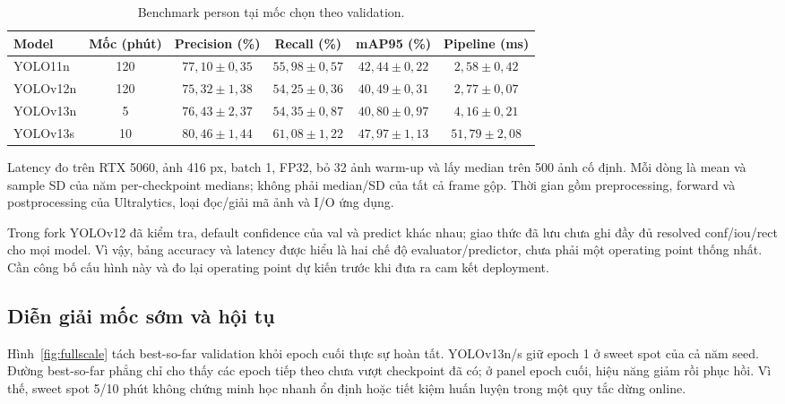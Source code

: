 \documentclass[a4paper,fleqn]{cas-dc}
\begin{document}
\begin{table}[t]
\centering
\small
\caption{Benchmark person tại mốc chọn theo validation.}
\begin{tabularx}{\textwidth}{@{}X c c c c c@{}}
\toprule
\textbf{Model} & \textbf{Mốc (phút)} & \textbf{Precision (\%)} & \textbf{Recall (\%)} & \textbf{mAP95 (\%)} & \textbf{Pipeline (ms)} \\
\midrule
YOLO11n & 120 & $77{,}10\pm0{,}35$ & $55{,}98\pm0{,}57$ & $42{,}44\pm0{,}22$ & $2{,}58\pm0{,}42$ \\
YOLOv12n & 120 & $75{,}32\pm1{,}38$ & $54{,}25\pm0{,}36$ & $40{,}49\pm0{,}31$ & $2{,}77\pm0{,}07$ \\
YOLOv13n & 5 & $76{,}43\pm2{,}37$ & $54{,}35\pm0{,}87$ & $40{,}80\pm0{,}97$ & $4{,}16\pm0{,}21$ \\
YOLOv13s & 10 & $80{,}46\pm1{,}44$ & $61{,}08\pm1{,}22$ & $47{,}97\pm1{,}13$ & $51{,}79\pm2{,}08$ \\
\bottomrule
\end{tabularx}
\label{tab:yolo_metrics}
\end{table}

Latency đo trên RTX 5060, ảnh 416 px, batch 1, FP32, bỏ 32 ảnh warm-up và lấy median trên 500 ảnh cố định. Mỗi dòng là mean và sample SD của năm per-checkpoint medians; không phải median/SD của tất cả frame gộp. Thời gian gồm preprocessing, forward và postprocessing của Ultralytics, loại đọc/giải mã ảnh và I/O ứng dụng.

Trong fork YOLOv12 đã kiểm tra, default confidence của val và predict khác nhau; giao thức đã lưu chưa ghi đầy đủ resolved conf/iou/rect cho mọi model. Vì vậy, bảng accuracy và latency được hiểu là hai chế độ evaluator/predictor, chưa phải một operating point thống nhất. Cần công bố cấu hình này và đo lại operating point dự kiến trước khi đưa ra cam kết deployment.

\subsection{Diễn giải mốc sớm và hội tụ}

Hình~\ref{fig:fullscale} tách best-so-far validation khỏi epoch cuối thực sự hoàn tất. YOLOv13n/s giữ epoch 1 ở sweet spot của cả năm seed. Đường best-so-far phẳng chỉ cho thấy các epoch tiếp theo chưa vượt checkpoint đã có; ở panel epoch cuối, hiệu năng giảm rồi phục hồi. Vì thế, sweet spot 5/10 phút không chứng minh học nhanh ổn định hoặc tiết kiệm huấn luyện trong một quy tắc dừng online.
\end{document}
